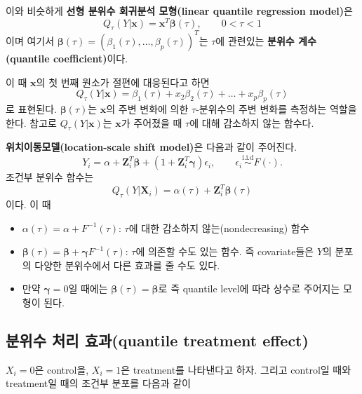 \documentclass[b5paper,]{scrbook}
\theoremstyle{plain}
\theoremstyle{definition}
\numberwithin{equation}{section}
\let\BeginKnitrBlock\begin \let\EndKnitrBlock\end
\begin{document}
이와 비슷하게 \textbf{선형 분위수 회귀분석 모형(linear quantile regression model)}은
\[Q_{\tau}(Y|\mathbf{x})=\mathbf{x}^{T}\boldsymbol{\beta}(\tau), \qquad{0<\tau <1}\]
이며 여기서 \(\boldsymbol{\beta}(\tau)=(\beta_{1}(\tau),\ldots , \beta_{p}(\tau))^{T}\)는 \(\tau\)에 관련있는 \textbf{분위수 계수(quantile coefficient)}이다.

이 때 \(\mathbf{x}\)의 첫 번째 원소가 절편에 대응된다고 하면
\[Q_{\tau}(Y|\mathbf{x})=\beta_{1}(\tau)+x_{2}\beta_{2}(\tau)+\ldots +x_{p}\beta_{p}(\tau)\]
로 표현된다. \(\boldsymbol{\beta}(\tau)\)는 \(\mathbf{x}\)의 주변 변화에 의한 \(\tau\)-분위수의 주변 변화를 측정하는 역할을 한다. 참고로 \(Q_{\tau}(Y|\mathbf{x})\)는 \(\mathbf{x}\)가 주어졌을 때 \(\tau\)에 대해 감소하지 않는 함수다.

\BeginKnitrBlock{example}[위치이동모델]
\protect\hypertarget{exm:unnamed-chunk-344}{}{\label{exm:unnamed-chunk-344} {} }\textbf{위치이동모델(location-scale shift model)}은 다음과 같이 주어진다.
\[Y_{i}=\alpha + \mathbf{Z}_{i}^{T}\boldsymbol{\beta} + (1+\mathbf{Z}_{i}^{T}\boldsymbol{\gamma})\epsilon_{i}, \qquad{\epsilon_{i}\stackrel{\text{i.i.d}}{\sim}F(\cdot).}\]
조건부 분위수 함수는
\[Q_{\tau}(Y|\mathbf{X}_{i})=\alpha(\tau)+\mathbf{Z}_{i}^{T}\boldsymbol{\beta}(\tau)\]
이다. 이 때

\begin{itemize}
\item
  \(\alpha(\tau)=\alpha + F^{-1}(\tau)\): \(\tau\)에 대한 감소하지 않는(nondecreasing) 함수
\item
  \(\boldsymbol{\beta}(\tau)=\boldsymbol{\beta}+\boldsymbol{\gamma}F^{-1}(\tau)\): \(\tau\)에 의존할 수도 있는 함수. 즉 covariate들은 \(Y\)의 분포의 다양한 분위수에서 다른 효과를 줄 수도 있다.
\item
  만약 \(\boldsymbol{\gamma}=0\)일 때에는 \(\boldsymbol{\beta}(\tau)=\boldsymbol{\beta}\)로 즉 quantile level에 따라 상수로 주어지는 모형이 된다.
\end{itemize}
\EndKnitrBlock{example}

\hypertarget{--quantile-treatment-effect}{%
\subsection{분위수 처리 효과(quantile treatment effect)}\label{--quantile-treatment-effect}}

\(X_{i}=0\)은 control을, \(X_{i}=1\)은 treatment를 나타낸다고 하자. 그리고 control일 때와 treatment일 때의 조건부 분포를 다음과 같이
\end{document}
